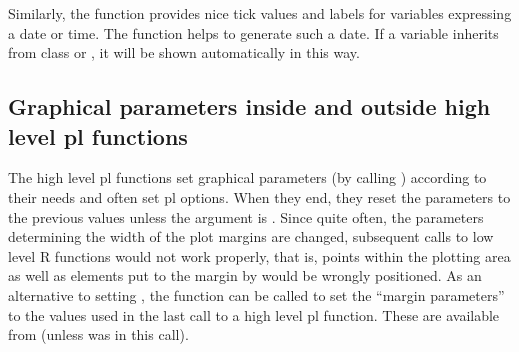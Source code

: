 \documentclass[11pt]{article}
\begin{document}
\label{options.dateaxis}
Similarly, the function  provides nice tick values and labels 
for variables expressing a date or time. 
The function  helps to generate such a date. 
If a variable inherits from class  or , it will be shown
automatically in this way.

\subsection{Graphical parameters inside and outside high level pl functions}
The high level pl functions set graphical parameters (by calling ) 
according to their needs and often set pl options. 
When they end, they reset the  parameters to the previous values
unless the argument  is .
Since quite often, the parameters determining the width of the plot margins are
changed, subsequent calls to low level R functions would not work properly,
that is, points within the plotting area as well as elements put to the 
margin by  would be wrongly positioned.
As an alternative to setting , the function 
can be called to set the ``margin parameters'' 
to the values used in the last call to a high level pl function.
These are available from  
(unless  was  in this call).
\end{document}
